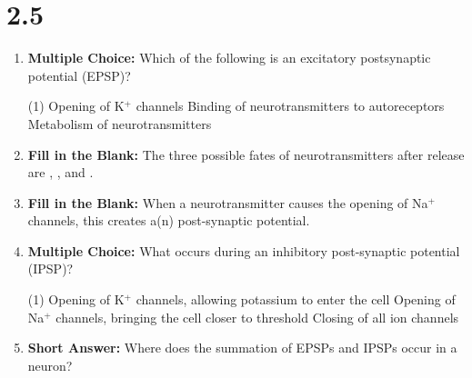 \squigglyline

\section*{2.5}
\begin{enumerate}[label=\textbf{Q2.5.\arabic*}]
      
      \item \textbf{Multiple Choice:} Which of the following is an excitatory postsynaptic potential (EPSP)?
            \begin{tasks}[label=\textcolor{draculafg}{(\Alph*)}, item-format=\color{draculafg}, label-width=1.5em, item-indent=1.7em](1)
                  \task Opening of K\(^+\) channels
                  \task Binding of neurotransmitters to autoreceptors
                  \task Metabolism of neurotransmitters
                  \task {}
            \end{tasks}

      \item \textbf{Fill in the Blank:} The three possible fates of neurotransmitters after release are  \cyanit{}, , and . \\

      \item \textbf{Fill in the Blank:} When a neurotransmitter causes the opening of Na\(^+\) channels, this creates a(n)  post-synaptic potential. \\
      
      \item \textbf{Multiple Choice:} What occurs during an inhibitory post-synaptic potential (IPSP)? 
            \begin{tasks}[label=\textcolor{draculafg}{(\Alph*)}, item-format=\color{draculafg}, label-width=1.5em, item-indent=1.7em](1)
                  \task Opening of K\(^+\) channels, allowing potassium to enter the cell
                  \task Opening of Na\(^+\) channels, bringing the cell closer to threshold
                  \task {}
                  \task Closing of all ion channels
            \end{tasks}
      
      \item \textbf{Short Answer:} Where does the summation of EPSPs and IPSPs occur in a neuron? \\


\end{enumerate}
